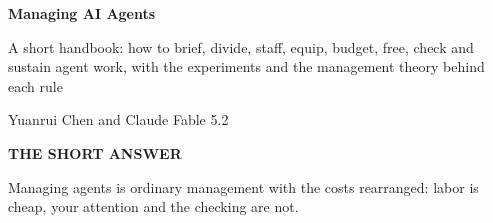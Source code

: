 \documentclass[11pt,letterpaper]{article}
\newcommand{\boxlabel}[1]{{\sffamily\footnotesize\bfseries\color{ink2} #1}}
\begin{document}
{\sffamily\bfseries\fontsize{23}{27}\selectfont Managing AI Agents\par}
\vspace{0.2em}
{\sffamily\fontsize{12.5}{16.5}\selectfont\color{ink2}\raggedright
A short handbook: how to brief, divide, staff, equip, budget, free, check and sustain agent
work, with the experiments and the management theory behind each rule\par}
\vspace{0.4em}
{\sffamily\small\color{ink2} Yuanrui Chen and Claude Fable 5.2\par}
\vspace{0.7em}

\begin{tcolorbox}[enhanced, breakable=false, colback=plane, colframe=plane, boxrule=0pt,
  borderline west={2.5pt}{0pt}{seriesblue}, arc=0pt, left=12pt, right=12pt, top=9pt, bottom=9pt]
\boxlabel{THE SHORT ANSWER}\par
\vspace{0.25em}
{\fontsize{12.5}{16.5}\selectfont\bfseries\raggedright Managing agents is ordinary management
with the costs rearranged: labor is cheap, your attention and the checking are not.\par}
\end{tcolorbox}
\end{document}

